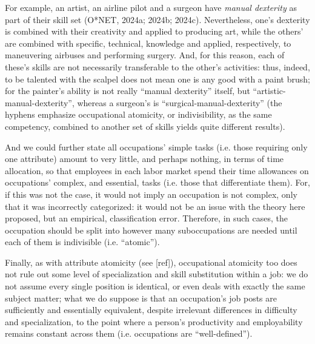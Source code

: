 \documentclass[hidelinks, nonatbib]{elsarticle}
\begin{document}
For example, an artist, an airline pilot and a surgeon have \textit{manual dexterity} as part of their skill set (O*NET, 2024a; 2024b; 2024c). Nevertheless, one's dexterity is combined with their creativity and applied to producing art, while the others' are combined with specific, technical, knowledge and applied, respectively, to maneuvering airbuses and performing surgery. And, for this reason, each of these's skills are not necessarily transferable to the other's activities: thus, indeed, to be talented with the scalpel does not mean one is any good with a paint brush; for the painter's ability is not really ``manual dexterity'' itself, but ``artistic-manual-dexterity'', whereas a surgeon's is ``surgical-manual-dexterity'' (the hyphens emphasize occupational atomicity, or indivisibility, as the same competency, combined to another set of skills yields quite different results).

And we could further state all occupations' simple tasks (i.e. those requiring only one attribute) amount to very little, and perhaps nothing, in terms of time allocation, so that employees in each labor market spend their time allowances on occupations' complex, and essential, tasks (i.e. those that differentiate them). For, if this was not the case, it would not imply an occupation is not complex, only that it was incorrectly categorized: it would not be an issue with the theory here proposed, but an empirical, classification error. Therefore, in such cases, the occupation should be split into however many suboccupations are needed until each of them is indivisible (i.e. ``atomic'').

Finally, as with attribute atomicity (see [ref]), occupational atomicity too does not rule out some level of specialization and skill substitution within a job: we do not assume every single position is identical, or even deals with exactly the same subject matter; what we do suppose is that an occupation's job posts are sufficiently and essentially equivalent, despite irrelevant differences in difficulty and specialization, to the point where a person's productivity and employability remains constant across them (i.e. occupations are ``well-defined'').
\end{document}
